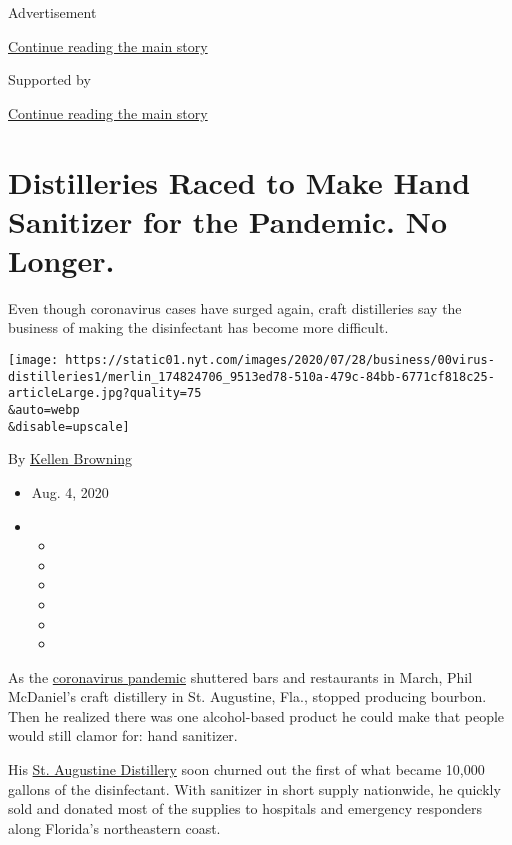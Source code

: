 Advertisement

\protect\hyperlink{after-top}{Continue reading the main story}

Supported by

\protect\hyperlink{after-sponsor}{Continue reading the main story}

\hypertarget{distilleries-raced-to-make-hand-sanitizer-for-the-pandemic-no-longer}{%
\section{Distilleries Raced to Make Hand Sanitizer for the Pandemic. No
Longer.}\label{distilleries-raced-to-make-hand-sanitizer-for-the-pandemic-no-longer}}

Even though coronavirus cases have surged again, craft distilleries say
the business of making the disinfectant has become more difficult.

\texttt{[image: https://static01.nyt.com/images/2020/07/28/business/00virus-distilleries1/merlin\_174824706\_9513ed78-510a-479c-84bb-6771cf818c25-articleLarge.jpg?quality=75\\\&auto=webp\\\&disable=upscale]}

By \href{https://www.nytimes.com/by/kellen-browning}{Kellen Browning}

\begin{itemize}
\item
  Aug. 4, 2020
\item
  \begin{itemize}
  \item
  \item
  \item
  \item
  \item
  \item
  \end{itemize}
\end{itemize}

As the
\href{https://www.nytimes.com/news-event/coronavirus?action=click\&pgtype=Article\&state=default\&module=styln-coronavirus\&region=TOP_BANNER\&context=storylines_menu}{coronavirus
pandemic} shuttered bars and restaurants in March, Phil McDaniel's craft
distillery in St. Augustine, Fla., stopped producing bourbon. Then he
realized there was one alcohol-based product he could make that people
would still clamor for: hand sanitizer.

His \href{http://staugustinedistillery.com/}{St. Augustine Distillery}
soon churned out the first of what became 10,000 gallons of the
disinfectant. With sanitizer in short supply nationwide, he quickly sold
and donated most of the supplies to hospitals and emergency responders
along Florida's northeastern coast.

